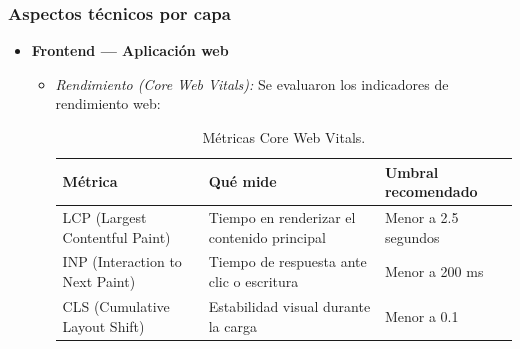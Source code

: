 \documentclass[12pt, atypical, journal]{article}
\begin{document}
\subsubsection{Aspectos técnicos por capa}
\begin{itemize}
    \item \textbf{Frontend — Aplicación web}
    \begin{itemize}
    \item \textit{Rendimiento (Core Web Vitals):} Se evaluaron los indicadores de rendimiento web:
    \begin{table}[H]
    \centering
    \small
    \begin{tabular}{|l|p{5cm}|p{4.5cm}|}
    \hline
    \textbf{Métrica} & \textbf{Qué mide} & \textbf{Umbral recomendado} \\ \hline
    LCP (Largest Contentful Paint) & Tiempo en renderizar el contenido principal & Menor a 2.5 segundos \\ \hline
    INP (Interaction to Next Paint) & Tiempo de respuesta ante clic o escritura & Menor a 200 ms \\ \hline
    CLS (Cumulative Layout Shift) & Estabilidad visual durante la carga & Menor a 0.1 \\ \hline
    \end{tabular}
    \caption{Métricas Core Web Vitals.}
    \label{tab:core_web_vitals}
    \end{table}
\end{itemize}


\end{itemize}
\end{document}
